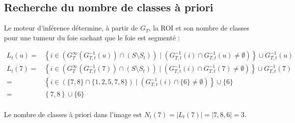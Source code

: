 	
	
		\subsection{Recherche du nombre de classes à priori}
		Le moteur d'inférence détermine, à partir de $G_T$, la ROI et son nombre de classes pour une tumeur du foie sachant que le foie est segmenté :			

	\begin{equation}
	 \begin{split}
	 L_t(u) = & \left\{ i \in \left( G_T^{\infty}(G_{T,t}^{-1} (u)) \cap ( S \setminus S_t ) \right) \;|\; \left( G_{T,t}^{-1} (i) \cap G_{T,t}^{-1} (u) \neq \emptyset \right) \right\} \cup  G_{T,t}^{-1}(u)\\
	 L_t(7) = & \left\{ i \in \left( G_T^{\infty}(G_{T,t}^{-1}(7)) \cap ( S \setminus S_t ) \right) \;|\; \left( G_{T,t}^{-1} (i) \cap G_{T,t}^{-1} (7) \neq \emptyset \right) \right\} \cup  G_{T,t}^{-1}(7)\\
		 = & \left\{ i \in \left( \{7,8\} \cap \{1,2,5,7,8\} \right) \;|\; \left( G_{T,t}^{-1} (i) \cap \{6\} \neq \emptyset \right) \right\} \cup  \{6\}\\
		 = & \left\{7,8 \right\} \cup  \{6\}\\
	 \end{split}
	 \label{eq:cas2}
	\end{equation}

Le nombre de classes à priori dans l'image est $N_t(7) = \left|{L_t(7)}\right| = \left|{7,8,6}\right| = 3$. %
		
